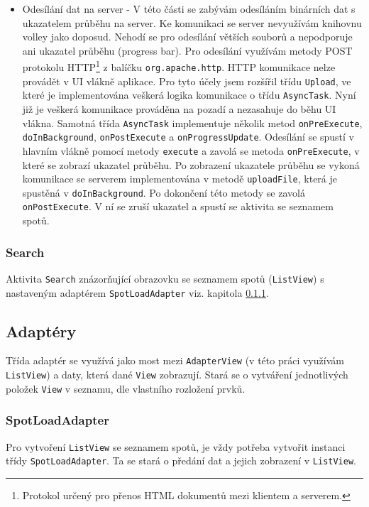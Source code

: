 \documentclass[12pt]{article}
\begin{document}
\begin{itemize}
\item Odesílání dat na server - V této části se zabývám odesíláním binárních dat s ukazatelem průběhu na server. Ke komunikaci se server nevyužívám knihovnu volley jako doposud. Nehodí se pro odesílání větších souborů a nepodporuje ani ukazatel průběhu (progress bar). Pro odesílání využívám metody POST protokolu HTTP\footnote[12]{Protokol určený pro přenos HTML dokumentů mezi klientem a serverem.} z balíčku \verb+org.apache.http+. HTTP komunikace nelze provádět v UI vlákně aplikace. Pro tyto účely jsem rozšířil třídu \verb+Upload+, ve které je implementována veškerá logika komunikace o třídu \verb+AsyncTask+. Nyní již je veškerá komunikace prováděna na pozadí a nezasahuje do běhu UI vlákna. Samotná třída \verb+AsyncTask+ implementuje několik metod \verb+onPreExecute+, \verb+doInBackground+, \verb+onPostExecute+ a \verb+onProgressUpdate+. Odesílání se spustí v hlavním vlákně pomocí metody \verb+execute+ a zavolá se metoda \verb+onPreExecute+, v které se zobrazí ukazatel průběhu. Po zobrazení ukazatele průběhu se vykoná komunikace se serverem implementována v metodě \verb+uploadFile+, která je spustěná v \verb+doInBackground+. Po dokončení této metody se zavolá \verb+onPostExecute+. V ní se zruší ukazatel a spustí se aktivita se seznamem spotů. %
\end{itemize}
\subsubsection{Search}
Aktivita \verb+Search+ znázorňující obrazovku se seznamem spotů (\verb+ListView+) s nastaveným adaptérem \verb+SpotLoadAdapter+ viz. kapitola \ref{SpotLoadAdapter}. 
\subsection{Adaptéry}
Třída adaptér se využívá jako most mezi \verb+AdapterView+ (v této práci využívám \verb+ListView+) a daty, která dané \verb+View+ zobrazují. Stará se o vytváření jednotlivých položek \verb+View+ v seznamu, dle vlastního rozložení prvků. \cite{adapter}
\subsubsection{SpotLoadAdapter}
\label{SpotLoadAdapter}
Pro vytvoření \verb+ListView+ se seznamem spotů, je vždy potřeba vytvořit instanci třídy \verb+SpotLoadAdapter+. Ta se stará o předání dat a jejich zobrazení v \verb+ListView+.
\end{document}

